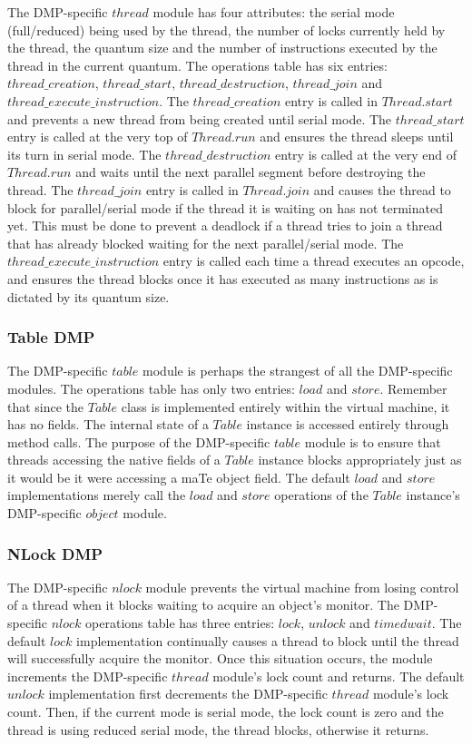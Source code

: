 The DMP-specific $thread$ module has four attributes: the serial mode
(full/reduced) being used by the thread, the number of locks currently
held by the thread, the quantum size and the number of instructions
executed by the thread in the current quantum.  The operations table
has six entries: $thread\_creation$, $thread\_start$,
$thread\_destruction$, $thread\_join$ and
$thread\_execute\_instruction$.  The $thread\_creation$ entry is
called in $Thread.start$ and prevents a new thread from being created
until serial mode.  The $thread\_start$ entry is called at the very
top of $Thread.run$ and ensures the thread sleeps until its turn in
serial mode.  The $thread\_destruction$ entry is called at the very
end of $Thread.run$ and waits until the next parallel segment before
destroying the thread.  The $thread\_join$ entry is called in
$Thread.join$ and causes the thread to block for parallel/serial mode
if the thread it is waiting on has not terminated yet.  This must be
done to prevent a deadlock if a thread tries to join a thread that has
already blocked waiting for the next parallel/serial mode.  The
$thread\_execute\_instruction$ entry is called each time a thread
executes an opcode, and ensures the thread blocks once it has executed
as many instructions as is dictated by its quantum size.

\subsubsection{Table DMP}

The DMP-specific $table$ module is perhaps the strangest of all the
DMP-specific modules.  The operations table has only two entries:
$load$ and $store$.  Remember that since the $Table$ class is
implemented entirely within the virtual machine, it has no fields.
The internal state of a $Table$ instance is accessed entirely through
method calls.  The purpose of the DMP-specific $table$ module is to
ensure that threads accessing the native fields of a $Table$ instance
blocks appropriately just as it would be it were accessing a maTe
object field.  The default $load$ and $store$ implementations merely
call the $load$ and $store$ operations of the $Table$ instance's
DMP-specific $object$ module.

\subsubsection{NLock DMP}

The DMP-specific $nlock$ module prevents the virtual machine from
losing control of a thread when it blocks waiting to acquire an
object's monitor.  The DMP-specific $nlock$ operations table has three
entries: $lock$, $unlock$ and $timedwait$.  The default $lock$
implementation continually causes a thread to block until the thread
will successfully acquire the monitor.  Once this situation occurs,
the module increments the DMP-specific $thread$ module's lock count
and returns.  The default $unlock$ implementation first decrements the
DMP-specific $thread$ module's lock count. Then, if the current mode
is serial mode, the lock count is zero and the thread is using reduced
serial mode, the thread blocks, otherwise it returns.

